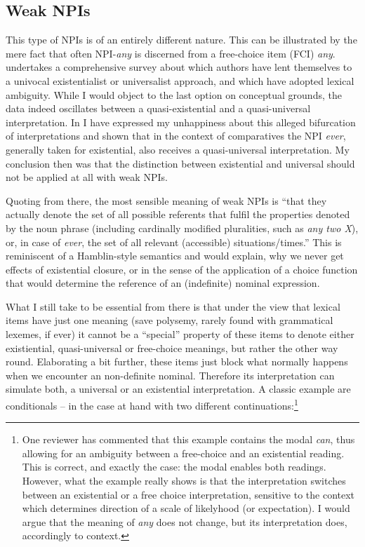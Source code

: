 \documentclass[output=paper,colorlinks,citecolor=brown,
]{langscibook}
\begin{document}
\subsection{Weak NPIs}

This type of NPIs is of an entirely different nature. This can be illustrated by the mere fact that often NPI-\textit{any} is discerned from a
free-choice item (FCI) \textit{any}. \citet{horn2000a} undertakes
a comprehensive survey about which authors have lent themselves to a univocal existentialist or universalist approach, and
which have adopted lexical ambiguity. While I would object to the last option on conceptual grounds, the data indeed
oscillates between a quasi-existential and a quasi-universal interpretation. In \citet{neubarth2017} I have expressed
my unhappiness about this alleged bifurcation of interpretations and shown that in the context of comparatives the NPI
\textit{ever}, generally taken for existential, also receives a quasi-universal interpretation. My conclusion then was
that the distinction between existential and universal should not be applied at all with weak NPIs.

Quoting from there, the most sensible meaning of weak NPIs is ``that they actually denote the set of all possible
referents that fulfil the properties denoted by the noun phrase (including cardinally modified pluralities, such as
{\em any two X}), or, in case of {\em ever}, the set of all relevant (accessible) situations/times.'' This is
reminiscent of a Hamblin-style semantics \citep{hamblin1973} and would explain, why we never get effects of existential
closure, or in the sense of \citet{reinhart1997} the application of a choice function that would determine the reference
of an (indefinite) nominal expression.

What I still take to be essential from there is that under the view that lexical items have just one meaning (save
polysemy, rarely found with grammatical lexemes, if ever) it cannot be a “special” property of these items to denote
either existiential, quasi-universal or free-choice meanings, but rather the other way round. Elaborating a bit
further, these items just block what normally happens when we encounter an non-definite nominal. Therefore its
interpretation can simulate both, a universal or an existential interpretation. A classic example are conditionals --
in the case at hand with two different continuations:\footnote{One reviewer has commented that this example contains
the modal \textit{can}, thus allowing for an ambiguity between a free-choice and an existential reading. This is correct,
and exactly the case: the modal enables both readings. However, what the example really shows is that the
interpretation switches between an existential or a free choice interpretation, sensitive to the context which
determines direction of a scale of likelyhood (or expectation). I would argue that the meaning of {\em any} does not
change, but its interpretation does, accordingly to context.}
\end{document}
